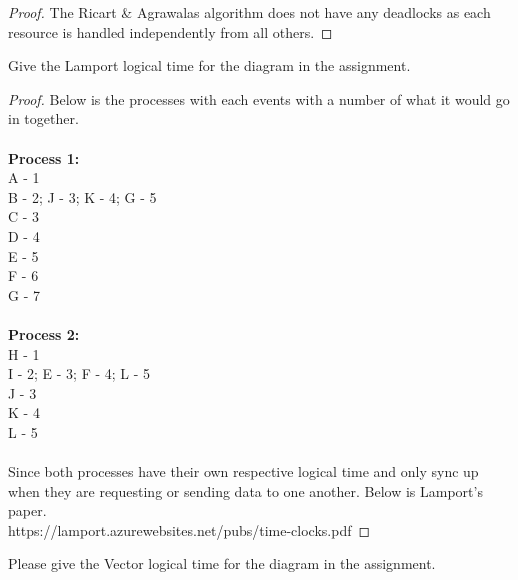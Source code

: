 \documentclass[12pt]{article}
\newenvironment{exercise}[2][Exercise]{\begin{trivlist}
\item[\hskip \labelsep {\bfseries #1}\hskip \labelsep {\bfseries #2.}]}{\end{trivlist}}
\begin{document}
\begin{proof}
The Ricart \& Agrawalas algorithm does not have any deadlocks as each resource is handled independently from all others.
\end{proof}

\begin{exercise}{9}
Give the Lamport logical time for the diagram in the assignment.
\end{exercise}

\begin{proof}
Below is the processes with each events with a number of what it would go in together. \\ \\
\textbf{Process 1:} \\
A - 1 \\ 
B - 2; J - 3; K - 4; G - 5\\
C - 3 \\
D - 4 \\
E - 5 \\
F - 6 \\ 
G - 7 \\ \\
\textbf{Process 2:} \\
H - 1 \\ 
I - 2; E - 3; F - 4; L - 5 \\
J - 3 \\ 
K - 4 \\
L - 5 \\ \\
Since both processes have their own respective logical time and only sync up when they are requesting or sending data to one another. Below is Lamport's paper. \\

https://lamport.azurewebsites.net/pubs/time-clocks.pdf

\end{proof}

\begin{exercise}{10}
Please give the Vector logical time for the diagram in the assignment.

\end{exercise}
\end{document}
